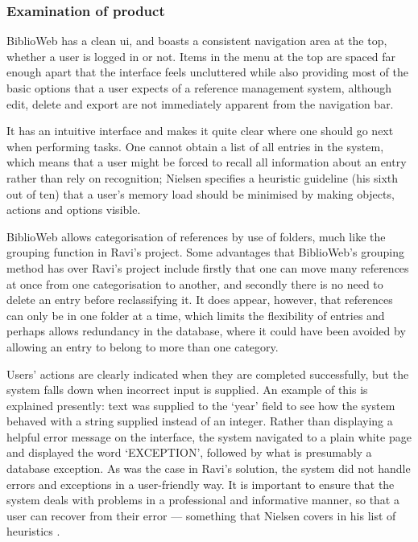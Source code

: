 \documentclass{l4proj}
\begin{document}
\subsubsection{Examination of product}
BiblioWeb has a clean \gls{ui}, and boasts a consistent navigation area at the top, whether a user is logged in or not.  Items in the menu at the top are spaced far enough apart that the interface feels uncluttered while also providing most of the basic options that a user expects of a reference management system, although edit, delete and export are not immediately apparent from the navigation bar. 

It has an intuitive interface and makes it quite clear where one should go next when performing tasks.  One cannot obtain a list of all entries in the system, which means that a user might be forced to recall all information about an entry rather than rely on recognition; Nielsen \cite{NielsenHeuristics} specifies a heuristic guideline (his sixth out of ten) that a user's memory load should be minimised by making objects, actions and options visible.

BiblioWeb allows categorisation of references by use of folders, much like the grouping function in Ravi's project.  Some advantages that BiblioWeb's grouping method has over Ravi's project include firstly that one can move many references at once from one categorisation to another, and secondly there is no need to delete an entry before reclassifying it.  It does appear, however, that references can only be in one folder at a time, which limits the flexibility of entries and perhaps allows redundancy in the database, where it could have been avoided by allowing an entry to belong to more than one category.

Users' actions are clearly indicated when they are completed successfully, but the system falls down when incorrect input is supplied.  An example of this is explained presently: text was supplied to the `year' field to see how the system behaved with a string supplied instead of an integer.  Rather than displaying a helpful error message on the interface, the system navigated to a plain white page and displayed the word `EXCEPTION', followed by what is presumably a database exception.  As was the case in Ravi's solution, the system did not handle errors and exceptions in a user-friendly way.  It is important to ensure that the system deals with problems in a professional and informative manner, so that a user can recover from their error --- something that Nielsen covers in his list of heuristics \cite{NielsenHeuristics}.
\end{document}
